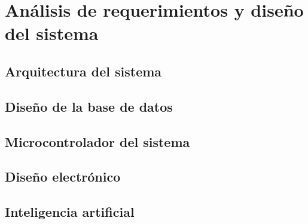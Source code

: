 \chapter{Análisis de requerimientos y diseño del sistema}
\label{chap:diseño_sistema}

\section{Arquitectura del sistema}


\section{Diseño de la base de datos}


\section{Microcontrolador del sistema}


\section{Diseño electrónico}


\section{Inteligencia artificial}

